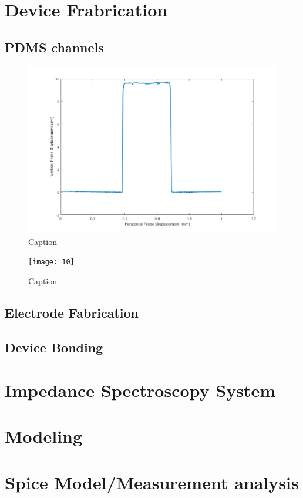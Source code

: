 
\section{Device Frabrication}

\subsection{PDMS channels}

\begin{figure}[h]
    \centering
    \includegraphics[width=\tesxtwidth]{images/300umWideChannel.png}
    \caption{Caption}
    \label{fig:profilometer_300um_channel}
\end{figure}

\begin{figure}
    \centering
    \texttt{[image: 10]}
    \caption{Caption}
    \label{fig:my_label}
\end{figure}

\subsection{Electrode Fabrication}

\subsection{Device Bonding}


\section{Impedance Spectroscopy System}


\section{Modeling}


\section{Spice Model/Measurement analysis}